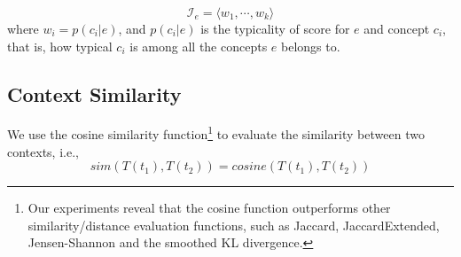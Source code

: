 \begin{equation}
\label{eq:Ie}
  \mathcal{I}_e = \langle w_1,\cdots,w_k\rangle
\end{equation}
where $w_i=p(c_i|e)$, and $p(c_i|e)$ is the
typicality of score for $e$ and concept $c_i$, that is, how typical
$c_i$ is among all the concepts $e$ belongs to.




\subsection{Context Similarity}
We use the cosine similarity function\footnote{Our experiments reveal that
the cosine function outperforms
other similarity/distance evaluation functions, such as Jaccard\cite{jaccard},
JaccardExtended, Jensen-Shannon\cite{JS} and the smoothed KL divergence\cite{KL}.}
to evaluate the similarity between two contexts, i.e.,
\begin{equation}
sim(T(t_{1}), T(t_{2})) = cosine(T(t_{1}), T(t_{2}))
\label{eq:cosine}
\end{equation}

